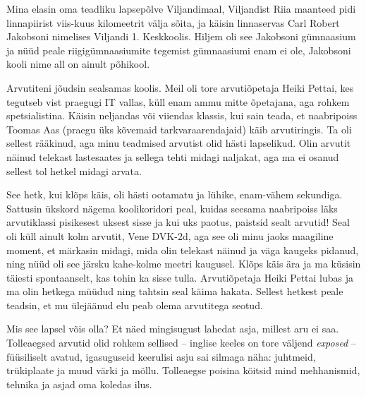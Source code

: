 \label{sisu:asko}


Mina elasin oma teadliku lapsepõlve 
Viljandimaal, Viljandist Riia maanteed pidi linnapiirist viis-kuus kilomeetrit välja sõita, ja käisin linnaservas Carl 
Robert Jakobsoni nimelises Viljandi 1. Keskkoolis. Hiljem oli see Jakobsoni 
gümnaasium ja nüüd peale riigigümnaasiumite tegemist gümnaasiumi enam ei ole, 
Jakobsoni kooli nime all on ainult põhikool. 

Arvutiteni jõudsin sealsamas koolis. Meil oli tore arvutiõpetaja 
Heiki Pettai, kes tegutseb vist praegugi 
IT vallas, küll enam ammu mitte õpetajana, aga rohkem 
spetsialistina. Käisin neljandas või viiendas 
klassis, kui sain teada, et naabripoiss Toomas Aas (praegu üks kõvemaid tarkvaraarendajaid) käib arvutiringis. Ta oli sellest 
rääkinud, aga minu teadmised arvutist olid hästi lapselikud. Olin arvutit näinud telekast lastesaates ja sellega
tehti midagi naljakat, aga ma ei osanud sellest tol hetkel 
midagi arvata. 

See hetk, kui klõps käis, oli hästi ootamatu ja 
lühike, enam-vähem sekundiga. Sattusin ükskord nägema koolikoridori 
peal, kuidas seesama naabripoiss läks arvutiklassi pisikesest uksest sisse ja kui uks paotus, paistsid sealt arvutid!
Seal oli küll ainult kolm arvutit, Vene DVK-2d, aga see oli minu jaoks
maagiline moment, et märkasin midagi, mida olin telekast näinud ja
väga kaugeks pidanud, ning nüüd oli see järsku kahe-kolme meetri 
kaugusel. Klõps käis ära ja ma küsisin täiesti spontaanselt, kas 
tohin ka sisse tulla. Arvutiõpetaja Heiki Pettai 
lubas ja ma olin hetkega müüdud ning tahtsin seal käima 
hakata. Sellest hetkest peale teadsin, et mu ülejäänud elu peab olema 
arvutitega seotud. 


Mis see lapsel võis olla? Et näed mingisugust lahedat asja, millest aru 
ei saa. Tolleaegsed arvutid olid rohkem sellised -- inglise keeles 
on tore väljend \emph{exposed} -- füüsiliselt avatud, 
igasuguseid keerulisi asju sai silmaga näha: juhtmeid, trükiplaate ja muud värki ja möllu. Tolleaegse 
poisina köitsid mind mehhanismid, tehnika ja asjad oma 
koledas ilus. 


